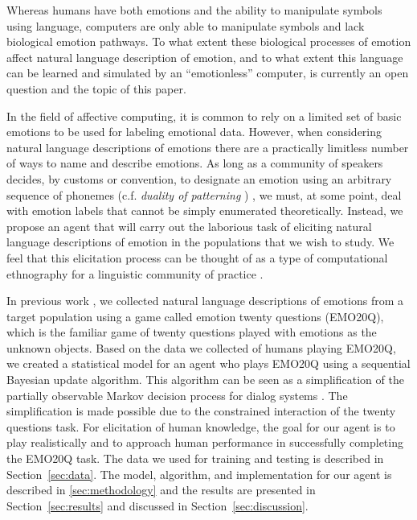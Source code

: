 \documentclass[a4paper]{article}
\begin{document}
Whereas humans have both emotions and the ability to manipulate symbols using
language, computers are only able to manipulate symbols and lack biological
emotion pathways.  To what extent these biological processes of emotion affect
natural language description of emotion, and to what extent this language can
be learned and simulated by an ``emotionless'' computer, is currently an open
question and the topic of this paper.

In the field of affective computing, it is common to rely on a limited set of
basic emotions to be used for labeling emotional data.  However, when
considering natural language descriptions of emotions there are a practically
limitless number of ways to name and describe emotions.  As long as a
community of speakers decides, by customs or convention, to designate an
emotion using an arbitrary sequence of phonemes (c.f. {\em duality of
  patterning} \cite{Hockett1968}) , we must, at some point, deal with emotion
labels that cannot be simply enumerated theoretically.  Instead, we propose an
agent that will carry out the laborious task of eliciting natural language
descriptions of emotion in the populations that we wish to study.  We feel
that this elicitation process can be thought of as a type of computational
ethnography \cite{Arnold2010} for a linguistic community of practice
\cite{Wenger1998}.

In previous work \cite{Kazemzadeh2011a}, we collected natural language
descriptions of emotions from a target population using a game called emotion
twenty questions (EMO20Q), which is the familiar game of twenty questions
played with emotions as the unknown objects.  Based on the data we collected
of humans playing EMO20Q, we created a statistical model for an agent who
plays EMO20Q using a sequential Bayesian update algorithm.  This algorithm can
be seen as a simplification of the partially observable Markov decision
process for dialog systems \cite{Williams2007,Thomson2008}.  The
simplification is made possible due to the constrained interaction of the
twenty questions task. For elicitation of human knowledge, the goal for our
agent is to play realistically and to approach human performance in
successfully completing the EMO20Q task.  The data we used for training and
testing is described in Section~\ref{sec:data}.  The model, algorithm, and
implementation for our agent is described in \ref{sec:methodology} and the
results are presented in Section~\ref{sec:results} and discussed in
Section~\ref{sec:discussion}.


\end{document}

